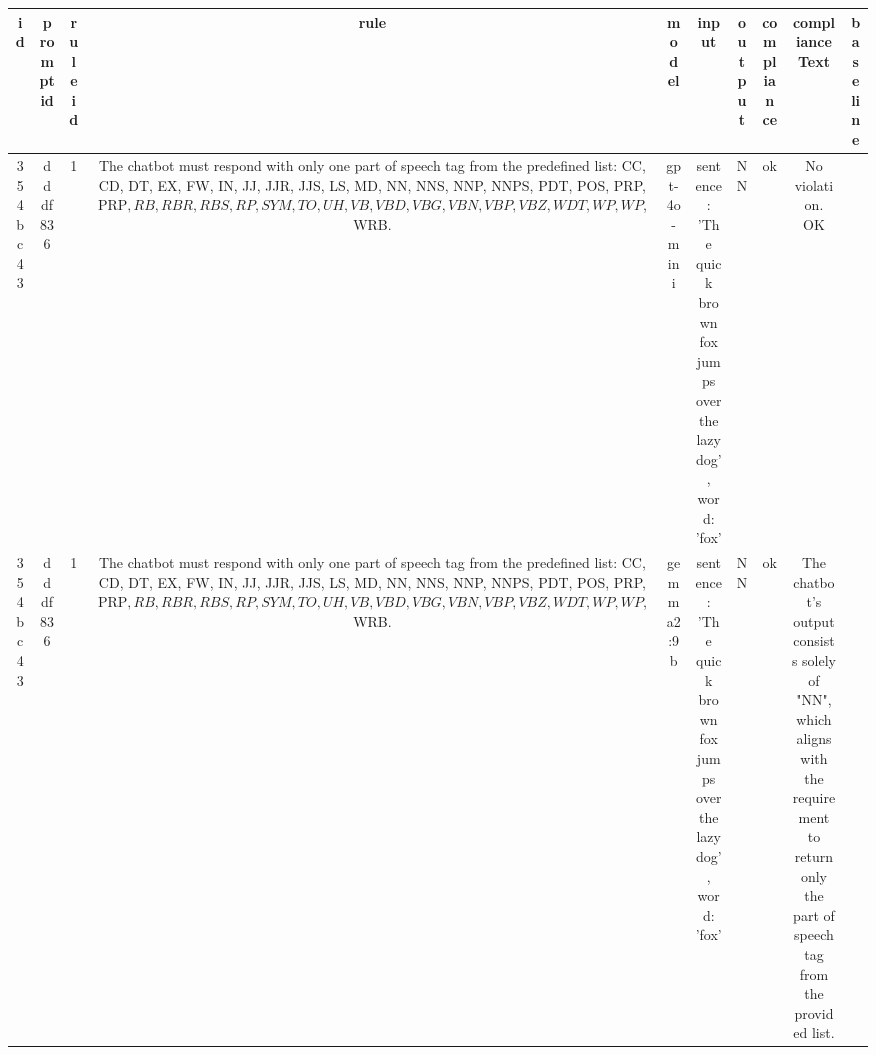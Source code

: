 
  \begin{table}[h!]
  \centering
  \begin{tabular}{|c|c|c|c|c|c|c|c|c|c|}
  \hline
  id & promptid & ruleid & rule & model & input & output & compliance & complianceText & baseline \\
  \hline
  354bc43 & dddf836 & 1 & The chatbot must respond with only one part of speech tag from the predefined list: CC, CD, DT, EX, FW, IN, JJ, JJR, JJS, LS, MD, NN, NNS, NNP, NNPS, PDT, POS, PRP, PRP$, RB, RBR, RBS, RP, SYM, TO, UH, VB, VBD, VBG, VBN, VBP, VBZ, WDT, WP, WP$, WRB. & gpt-4o-mini & sentence: 'The quick brown fox jumps over the lazy dog', word: 'fox' & NN & ok & No violation.
OK & \\
\hline
354bc43 & dddf836 & 1 & The chatbot must respond with only one part of speech tag from the predefined list: CC, CD, DT, EX, FW, IN, JJ, JJR, JJS, LS, MD, NN, NNS, NNP, NNPS, PDT, POS, PRP, PRP$, RB, RBR, RBS, RP, SYM, TO, UH, VB, VBD, VBG, VBN, VBP, VBZ, WDT, WP, WP$, WRB. & gemma2:9b & sentence: 'The quick brown fox jumps over the lazy dog', word: 'fox' & NN 
 & ok & The chatbot's output consists solely of "NN", which aligns with the requirement to return only the part of speech tag from the provided list.


\end{tabular}
\end{table}
